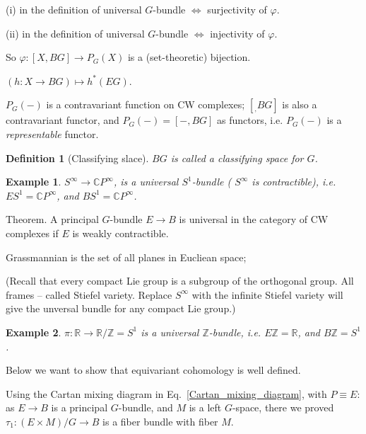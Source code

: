 \documentclass{article}
\theoremstyle{mystyle}
\newtheorem*{definition}{Definition}%
\newtheorem*{example}{Example}
\theoremstyle{remark}
\numberwithin{equation}{section}
\begin{document}
(i) in the definition of universal $G$-bundle $\Leftrightarrow$ surjectivity of $\varphi$.

(ii) in the definition of universal $G$-bundle $\Leftrightarrow$ injectivity of $\varphi$.

So $\varphi\colon [X,BG]\rightarrow P_G(X)$ is a (set-theoretic) bijection.

$(h\colon X\rightarrow BG)\mapsto h^*(EG)$. 

$P_G(-)$ is a contravariant function on CW complexes; $[_,BG]$ is also a contravariant functor, and $P_G(-) = [-,BG]$ as functors, i.e. $P_G(-)$ is a \emph{representable} functor.

\begin{definition}[Classifying slace] $BG$ is called a \emph{classifying space} for $G$.
\end{definition}

\begin{example}
$S^\infty\rightarrow \mathbb{C}P^\infty$, is a universal $S^1$-bundle ( $S^\infty$ is contractible), i.e. $ES^1 = \mathbb{C}P^\infty$, and $BS^1 = \mathbb{C}P^\infty$.
\end{example}



Theorem. A principal $G$-bundle $E\rightarrow B$ is universal in the category of CW complexes if $E$ is weakly contractible.

Grassmannian is the set of all planes in Eucliean space;

(Recall that every compact Lie group is a subgroup of the orthogonal group. All frames -- called Stiefel variety. Replace $S^\infty$ with the infinite Stiefel variety will give the unversal bundle for any compact Lie group.)


\begin{example}
$\pi\colon \mathbb{R}\rightarrow \mathbb{R}/\mathbb{Z} = S^1$ is a universal $\mathbb{Z}$-bundle, i.e. $E\mathbb{Z} = \mathbb{R}$, and $B\mathbb{Z} = S^1$.
\end{example}



Below we want to show that equivariant cohomology is well defined.

Using the Cartan mixing diagram in Eq.~\eqref{Cartan_mixing_diagram}, with $P\equiv E$: as $E\rightarrow B$ is a principal $G$-bundle, and $M$ is a left $G$-space, there we proved $\tau_1\colon (E\times M)/G\rightarrow B$ is a fiber bundle with fiber $M$.
\end{document}
